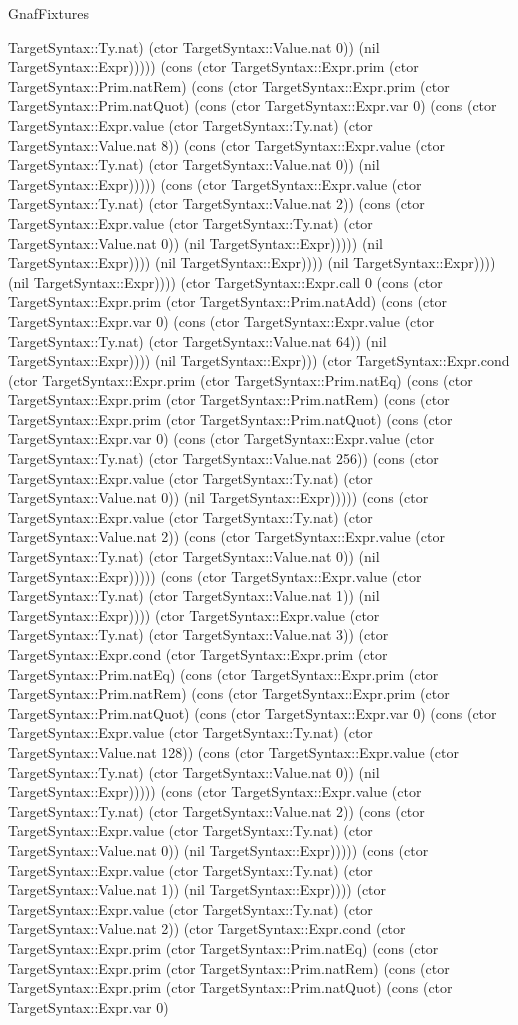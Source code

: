 \begin{lexlean}{GnafFixtures}
\begin{semanticmodule}
{TargetSyntax::Ty.nat) (ctor TargetSyntax::Value.nat 0)) (nil TargetSyntax::Expr))))) (cons (ctor TargetSyntax::Expr.prim (ctor TargetSyntax::Prim.natRem) (cons (ctor TargetSyntax::Expr.prim (ctor TargetSyntax::Prim.natQuot) (cons (ctor TargetSyntax::Expr.var 0) (cons (ctor TargetSyntax::Expr.value (ctor TargetSyntax::Ty.nat) (ctor TargetSyntax::Value.nat 8)) (cons (ctor TargetSyntax::Expr.value (ctor TargetSyntax::Ty.nat) (ctor TargetSyntax::Value.nat 0)) (nil TargetSyntax::Expr))))) (cons (ctor TargetSyntax::Expr.value (ctor TargetSyntax::Ty.nat) (ctor TargetSyntax::Value.nat 2)) (cons (ctor TargetSyntax::Expr.value (ctor TargetSyntax::Ty.nat) (ctor TargetSyntax::Value.nat 0)) (nil TargetSyntax::Expr))))) (nil TargetSyntax::Expr)))) (nil TargetSyntax::Expr)))) (nil TargetSyntax::Expr)))) (nil TargetSyntax::Expr)))) (ctor TargetSyntax::Expr.call 0 (cons (ctor TargetSyntax::Expr.prim (ctor TargetSyntax::Prim.natAdd) (cons (ctor TargetSyntax::Expr.var 0) (cons (ctor TargetSyntax::Expr.value (ctor TargetSyntax::Ty.nat) (ctor TargetSyntax::Value.nat 64)) (nil TargetSyntax::Expr)))) (nil TargetSyntax::Expr))) (ctor TargetSyntax::Expr.cond (ctor TargetSyntax::Expr.prim (ctor TargetSyntax::Prim.natEq) (cons (ctor TargetSyntax::Expr.prim (ctor TargetSyntax::Prim.natRem) (cons (ctor TargetSyntax::Expr.prim (ctor TargetSyntax::Prim.natQuot) (cons (ctor TargetSyntax::Expr.var 0) (cons (ctor TargetSyntax::Expr.value (ctor TargetSyntax::Ty.nat) (ctor TargetSyntax::Value.nat 256)) (cons (ctor TargetSyntax::Expr.value (ctor TargetSyntax::Ty.nat) (ctor TargetSyntax::Value.nat 0)) (nil TargetSyntax::Expr))))) (cons (ctor TargetSyntax::Expr.value (ctor TargetSyntax::Ty.nat) (ctor TargetSyntax::Value.nat 2)) (cons (ctor TargetSyntax::Expr.value (ctor TargetSyntax::Ty.nat) (ctor TargetSyntax::Value.nat 0)) (nil TargetSyntax::Expr))))) (cons (ctor TargetSyntax::Expr.value (ctor TargetSyntax::Ty.nat) (ctor TargetSyntax::Value.nat 1)) (nil TargetSyntax::Expr)))) (ctor TargetSyntax::Expr.value (ctor TargetSyntax::Ty.nat) (ctor TargetSyntax::Value.nat 3)) (ctor TargetSyntax::Expr.cond (ctor TargetSyntax::Expr.prim (ctor TargetSyntax::Prim.natEq) (cons (ctor TargetSyntax::Expr.prim (ctor TargetSyntax::Prim.natRem) (cons (ctor TargetSyntax::Expr.prim (ctor TargetSyntax::Prim.natQuot) (cons (ctor TargetSyntax::Expr.var 0) (cons (ctor TargetSyntax::Expr.value (ctor TargetSyntax::Ty.nat) (ctor TargetSyntax::Value.nat 128)) (cons (ctor TargetSyntax::Expr.value (ctor TargetSyntax::Ty.nat) (ctor TargetSyntax::Value.nat 0)) (nil TargetSyntax::Expr))))) (cons (ctor TargetSyntax::Expr.value (ctor TargetSyntax::Ty.nat) (ctor TargetSyntax::Value.nat 2)) (cons (ctor TargetSyntax::Expr.value (ctor TargetSyntax::Ty.nat) (ctor TargetSyntax::Value.nat 0)) (nil TargetSyntax::Expr))))) (cons (ctor TargetSyntax::Expr.value (ctor TargetSyntax::Ty.nat) (ctor TargetSyntax::Value.nat 1)) (nil TargetSyntax::Expr)))) (ctor TargetSyntax::Expr.value (ctor TargetSyntax::Ty.nat) (ctor TargetSyntax::Value.nat 2)) (ctor TargetSyntax::Expr.cond (ctor TargetSyntax::Expr.prim (ctor TargetSyntax::Prim.natEq) (cons (ctor TargetSyntax::Expr.prim (ctor TargetSyntax::Prim.natRem) (cons (ctor TargetSyntax::Expr.prim (ctor TargetSyntax::Prim.natQuot) (cons (ctor TargetSyntax::Expr.var 0) }
\end{semanticmodule}
\end{lexlean}
